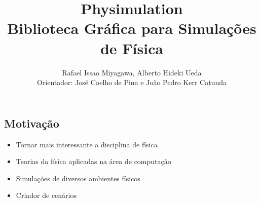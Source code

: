 \documentclass[plainboxedsections]{sciposter}
\title{Physimulation \\ Biblioteca Gráfica para Simulações de Física}
\author{Rafael Issao Miyagawa, Alberto Hideki Ueda\\ Orientador: José Coelho de Pina e João Pedro Kerr Catunda}
\institute{Instituto de Matemática e Estatística - Universidade de São Paulo}
\begin{document}
\maketitle

\renewcommand{\papertype}{a2}
\renewcommand{\sectionsize}{\Huge}

\begin{multicols}{2}

  \section*{Motivação}
  \fontsize{50pt}{15pt}\selectfont
  \begin{itemize}
    \item Tornar mais interessante a disciplina de física
    \item Teorias da física aplicadas na área de computação
    \item Simulações de diversos ambientes físicos
    \item Criador de cenários 
  \end{itemize}


\end{multicols}
\end{document}
